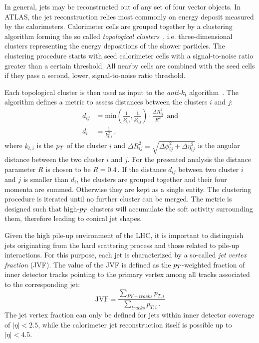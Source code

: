 In general, jets may be reconstructed out of any set of four vector objects. 
In ATLAS, the jet reconstruction relies most commonly on energy deposit measured by the calorimeters.
Calorimeter cells are grouped together by a clustering algorithm forming the so called \emph{topological clusters}~\cite{TopoClusterAlgo},
i.e. three-dimensional clusters representing the energy depositions of the shower particles.
The clustering procedure starts with seed calorimeter cells with a signal-to-noise ratio greater than a certain threshold. 
All nearby cells are combined with the seed cells if they pass a second, lower, signal-to-noise ratio threshold.

Each topological cluster is then used as  input  to the \emph{anti-$k_t$} algorithm~\cite{antikt}. The algorithm defines a metric
to assess distances between the clusters $i$ and $j$:
\begin{align}
d_{ij} &= \text{min}(\frac{1}{k_{t,i}^2}, \frac{1}{k_{t,j}^2}) \cdot \frac{\Delta R_{ij}^2}{R^2}  ~ ~ \text{and}\\
d_i   &= \frac{1}{k_{t,i}^2} \, ,
\end{align}
where $k_{t,i}$ is the $p_{T}$ of the cluster $i$ and $\Delta R_{ij}^2 = \sqrt{\Delta\phi_{ij}^2 + \Delta\eta_{ij}^2}$
is the angular distance between the two cluster $i$ and $j$. For
the presented  analysis the distance parameter $R$ is chosen to be $R=0.4\,$.
If the distance $d_{ij}$ between two cluster $i$ and $j$  is smaller than $d_i$, the clusters are grouped together and their four momenta are
summed. Otherwise they are kept as a single entity. The clustering procedure is iterated until no further cluster can be merged. 
The metric is designed such  that high-$p_{T}$ clusters will accumulate the soft activity surrounding them, therefore leading to conical
jet shapes. 

Given the high pile-up environment of the LHC, it   is important to distinguish jets originating  from the hard scattering process and those
related to pile-up interactions. For this purpose, each jet is characterized by a so-called \emph{jet vertex fraction} (JVF).
The value of the JVF is defined as the $p_{T}$-weighted fraction of inner detector tracks pointing
to  the primary vertex among all tracks associated to the corresponding jet:
\begin{equation}
\text{JVF} = \frac{\sum\limits_{PV-tracks}p_{T,i}}{\sum\limits_{tracks}p_{T,i} \,.}
\end{equation} 
The jet vertex fraction  can only be defined for jets  within inner detector coverage of $|\eta| < 2.5$,
while the calorimeter jet reconstruction itself is possible up to $|\eta| < 4.5$.

